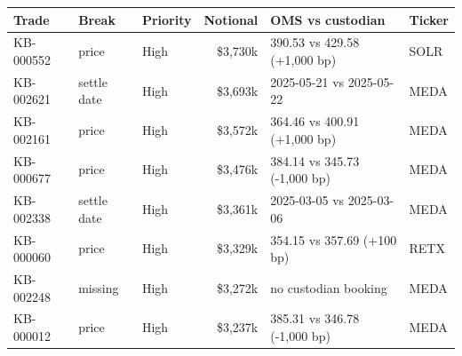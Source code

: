 \begin{tabular}{@{}lllrll@{}}
\toprule
\textbf{Trade} & \textbf{Break} & \textbf{Priority} & \textbf{Notional} & \textbf{OMS vs custodian} & \textbf{Ticker} \\
\midrule
KB-000552 & price & High & \$3,730k & 390.53 vs 429.58 (+1,000 bp) & SOLR \\
KB-002621 & settle date & High & \$3,693k & 2025-05-21 vs 2025-05-22 & MEDA \\
KB-002161 & price & High & \$3,572k & 364.46 vs 400.91 (+1,000 bp) & MEDA \\
KB-000677 & price & High & \$3,476k & 384.14 vs 345.73 (-1,000 bp) & MEDA \\
KB-002338 & settle date & High & \$3,361k & 2025-03-05 vs 2025-03-06 & MEDA \\
KB-000060 & price & High & \$3,329k & 354.15 vs 357.69 (+100 bp) & RETX \\
KB-002248 & missing & High & \$3,272k & no custodian booking & MEDA \\
KB-000012 & price & High & \$3,237k & 385.31 vs 346.78 (-1,000 bp) & MEDA \\
\bottomrule
\end{tabular}